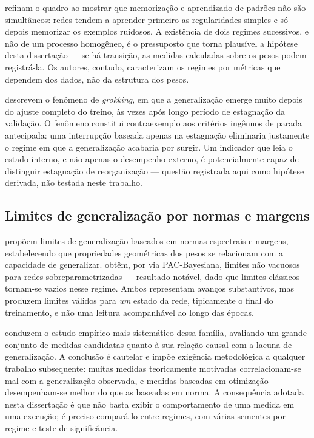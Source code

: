  refinam o quadro ao mostrar que memorização e aprendizado
de padrões não são simultâneos: redes tendem a aprender primeiro as
regularidades simples e só depois memorizar os exemplos ruidosos. A existência
de dois regimes sucessivos, e não de um processo homogêneo, é o pressuposto que
torna plausível a hipótese desta dissertação --- se há transição, as medidas
calculadas sobre os pesos podem registrá-la. Os autores, contudo, caracterizam os regimes por
métricas que dependem dos dados, não da estrutura dos pesos.

 descrevem o fenômeno de \emph{grokking}, em que a
generalização emerge muito depois do ajuste completo do treino, às vezes após
longo período de estagnação da validação. O fenômeno constitui contraexemplo aos
critérios ingênuos de parada antecipada: uma interrupção baseada apenas na
estagnação eliminaria justamente o regime em que a generalização acabaria por
surgir. Um indicador que leia o estado interno, e não apenas o desempenho
externo, é potencialmente capaz de distinguir estagnação de reorganização ---
questão registrada aqui como hipótese derivada, não testada neste trabalho.

\subsection{Limites de generalização por normas e margens}
\label{sec:ea-normas}

 propõem limites de generalização baseados em normas
espectrais e margens, estabelecendo que propriedades geométricas dos pesos se
relacionam com a capacidade de generalizar.  obtêm,
por via PAC-Bayesiana, limites não vacuosos para redes sobreparametrizadas ---
resultado notável, dado que limites clássicos tornam-se vazios nesse regime.
Ambos representam avanços substantivos, mas produzem limites válidos para
\emph{um} estado da rede, tipicamente o final do treinamento, e não uma leitura
acompanhável ao longo das épocas.

 conduzem o estudo empírico mais sistemático dessa
família, avaliando um grande conjunto de medidas candidatas quanto à sua relação
causal com a lacuna de generalização. A conclusão é cautelar e impõe exigência
metodológica a qualquer trabalho subsequente: muitas medidas teoricamente
motivadas correlacionam-se mal com a generalização observada, e medidas baseadas
em otimização desempenham-se melhor do que as baseadas em norma. A consequência
adotada nesta dissertação é que não basta exibir o comportamento de uma medida
em uma execução; é preciso compará-lo entre regimes, com várias sementes por
regime e teste de significância.

